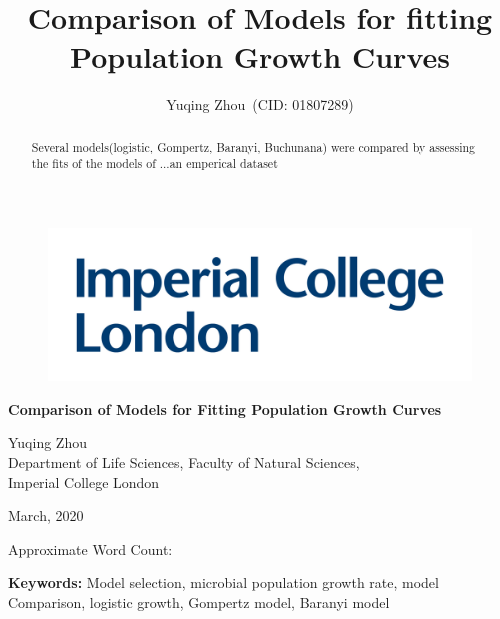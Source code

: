 \documentclass[a4paper,11pt]{article}
\theoremstyle{definition}
\newcommand{\ReportAuthor}{Yuqing Zhou}
\newcommand{\ReportAffil}{Department of Life Sciences, Faculty of Natural Sciences,\\Imperial College London}
\newcommand{\ReportTitle}{Comparison of Models for Fitting Population Growth Curves}
\begin{document}
    \begin{titlepage}
        \vspace{10pt}
        \begin{figure}[!ht]
            \centering
                \begin{center}
                     \includegraphics[width=\linewidth]{../results/IMP_LOGO.jpg}
                \end{center}
        \end{figure}

        \vspace{5pt}
    	\begin{center}
            \Huge\textbf{\ReportTitle}\\
        \end{center}
        
        \begin{center}
        \vspace{\fill}
            \LARGE\ReportAuthor\\
		    \vspace{6pt}
            \Large\ReportAffil
        \end{center}
        	
        \begin{center}
        \vspace{\fill}
    	    \normalsize{March, 2020}
        \end{center}       
        \begin{flushright}
		    \normalsize Approximate Word Count: %
	    \end{flushright}
    \end{titlepage}
    

\title{Comparison of Models for fitting Population Growth Curves}
\author{Yuqing Zhou\ (CID: 01807289)}

\date{}
\maketitle
\linenumbers
\begin{abstract}
Several models(logistic, Gompertz, Baranyi, Buchunana) were compared by assessing the fits of the models of ...an emperical dataset
\end{abstract}
\textbf{Keywords:} Model selection, microbial population growth rate, model Comparison, logistic growth, Gompertz model, Baranyi model
\end{document}
